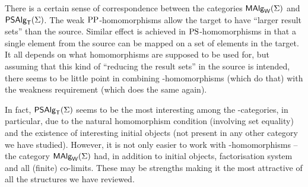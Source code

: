 \documentclass[10pt]{article}
\begin{document}
\begin{LS}
\item
There is a certain sense of correspondence between the categories
$\mbox{\rm\sf MAlg}_{\sf W}(\Sigma)$ and $\mbox{\sf PSAlg}_{\sf T}(\Sigma)$.  The weak ${\rm PP}$-homomorphisms allow the target
to have ``larger result sets'' than the source. Similar effect is
achieved in ${\rm PS}$-homomorphisms in that a single element from the
source can be mapped on a set of elements in the target. It all
depends on what homomorphisms are supposed to be used for, but
assuming that this kind of ``reducing the result sets'' in the source
is intended, there seems to be little point in combining
\PS-homomorphisms (which do that) with the weakness requirement (which
does the same again).

In fact, $\mbox{\sf PSAlg}_{\sf T}(\Sigma)$ seems to be the most interesting among the
\PS-categories, in particular, due to the natural homomorphism
condition (involving set equality) and the existence of
interesting initial objects (not present in any other category we have
studied). However, it is not only easier to work with
\PP-homomorphisms -- the category $\mbox{\rm\sf MAlg}_{\sf W}(\Sigma)$ had, in addition to initial
objects, factorisation system and all (finite) co-limits. These may be
strengths making it the most attractive of all the structures we have
reviewed.
\end{LS}




\end{document}
